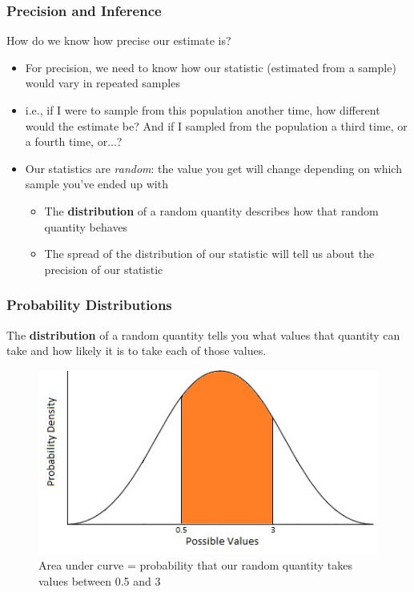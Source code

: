 \documentclass[12pt, 
hyperref={colorlinks=true, linkcolor=blue, urlcolor=cyan}]{beamer}
\begin{document}
\begin{frame}
\frametitle{Precision and Inference}
How do we know how precise our estimate is?
\begin{itemize}
\item For precision, we need to know how our statistic (estimated from a sample) would vary in repeated samples
\item i.e., if I were to sample from this population another time, how different would the estimate be? And if I sampled from the population a third time, or a fourth time, or...?
\item Our statistics are \textit{random}: the value you get will change depending on which sample you've ended up with
	\begin{itemize}
	\item The \textbf{distribution} of a random quantity describes how that random quantity behaves
	\item The spread of the distribution of our statistic will tell us about the precision of our statistic
	\end{itemize}
\end{itemize}
\end{frame}

\begin{frame}
\frametitle{Probability Distributions}

The \textbf{distribution} of a random quantity tells you what values that quantity can take and how likely it is to take each of those values.

\begin{figure}
\includegraphics[height=0.4\textheight]{./normal-density}
\caption{\color{orange} Area under curve \color{black}= probability that our random quantity takes values between 0.5 and 3}
\end{figure}

\end{frame}
\end{document}
